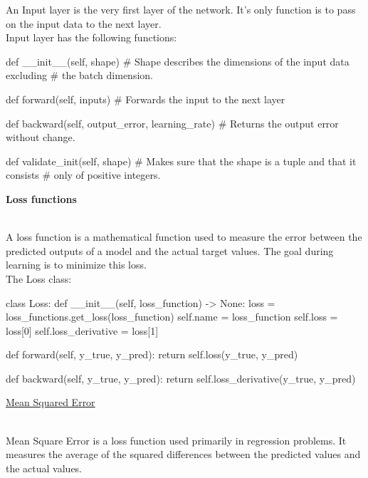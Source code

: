 \documentclass{article}
\begin{document}
An Input layer is the very first layer of the network. It's only 
function is to pass on the input data to the next layer. \\

Input layer has the following functions:
\begin{python}
def __init__(self,
             shape)
# Shape describes the dimensions of the input data excluding
# the batch dimension.
\end{python}
\begin{python}
def forward(self,
            inputs)
# Forwards the input to the next layer            
\end{python}
\begin{python}
def backward(self,
             output_error,
             learning_rate)
# Returns the output error without change.
\end{python}
\begin{python}
def validate_init(self,
                  shape)
# Makes sure that the shape is a tuple and that it consists
# only of positive integers.                
\end{python}
\pagebreak

    \hypertarget{losses}{\textbf{Loss functions}} \\

    A loss function is a mathematical function used to measure the 
    error between the predicted outputs of a model and the actual 
    target values. The goal during learning is to minimize this loss. \\

    The Loss class:
\begin{python}
class Loss:
    def __init__(self, loss_function) -> None:
        loss = loss_functions.get_loss(loss_function)
        self.name = loss_function
        self.loss = loss[0]
        self.loss_derivative = loss[1]

    def forward(self, y_true, y_pred):
        return self.loss(y_true, y_pred)

    def backward(self, y_true, y_pred):
        return self.loss_derivative(y_true, y_pred)
\end{python}
    \pagebreak

    \hypertarget{mse}{\underline{Mean Squared Error}} \\

    Mean Square Error is a loss function used primarily in regression
    problems. It measures the average of the squared differences
    between the predicted values and the actual values.
\end{document}
